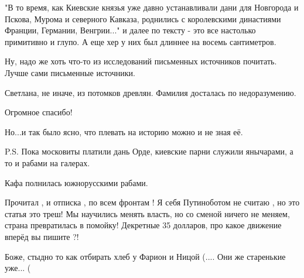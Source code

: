 \begin{itemize}
"В то время, как Киевские князья уже давно устанавливали дани для Новгорода и
Пскова, Мурома и северного Кавказа, роднились с королевскими династиями
Франции, Германии, Венгрии..." и далее по тексту - это все настолько примитивно
и глупо. А еще хер у них был длиннее на восемь сантиметров.

Ну, надо же хоть что-то из исследований письменных источников почитать. Лучше
сами письменные источники.

 

Светлана, не иначе, из потомков древлян. Фамилия досталась по недоразумению.


 

Огромное спасибо!

Но...и так было ясно, что плевать на историю можно и не зная её.

P.S. Пока московиты платили дань Орде, киевские парни служили янычарами, а то и
рабами на галерах.

Кафа полнилась южнорусскими рабами.

 

Прочитал , и отписка , по всем фронтам ! Я себя Путиноботом не считаю , но это
статья это треш! Мы научились менять власть, но со сменой ничего не меняем,
страна превратилась в помойку! Декретные 35 долларов, про какое движение вперёд
вы пишите ?!


 

Боже, стыдно то как отбирать хлеб у Фарион и Ницой (.... Они же старенькие
уже... (



\end{itemize}
